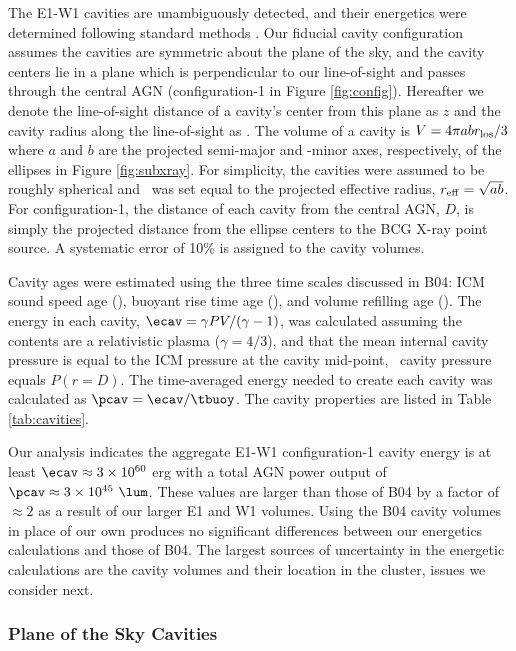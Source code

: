 \documentclass[11pt, preprint]{aastex}
\begin{document}
The E1-W1 cavities are unambiguously detected, and their energetics
were determined following standard methods \citep[see][for a
  review]{mcnamrev}. Our fiducial cavity configuration assumes the
cavities are symmetric about the plane of the sky, and the cavity
centers lie in a plane which is perpendicular to our line-of-sight and
passes through the central AGN (configuration-1 in Figure
\ref{fig:config}). Hereafter we denote the line-of-sight distance of a
cavity's center from this plane as $z$ and the cavity radius along the
line-of-sight as \rlos. The volume of a cavity is $V = 4\pi a b
r_{\rm{los}}/3$ where $a$ and $b$ are the projected semi-major and -minor
axes, respectively, of the ellipses in Figure \ref{fig:subxray}. For
simplicity, the cavities were assumed to be roughly spherical and
\rlos\ was set equal to the projected effective radius, $r_{\rm{eff}} =
\sqrt{ab}$. For configuration-1, the distance of each cavity from the
central AGN, $D$, is simply the projected distance from the ellipse
centers to the BCG X-ray point source. A systematic error of 10\% is
assigned to the cavity volumes.

Cavity ages were estimated using the three time scales discussed in
B04: ICM sound speed age (\tsonic), buoyant rise time age (\tbuoy),
and volume refilling age (\trefill). The energy in each cavity, $\ecav
= \gamma PV/(\gamma-1)$, was calculated assuming the contents are a
relativistic plasma ($\gamma = 4/3$), and that the mean internal
cavity pressure is equal to the ICM pressure at the cavity mid-point,
\ie\ cavity pressure equals $P(r = D)$. The time-averaged energy
needed to create each cavity was calculated as $\pcav =
\ecav/\tbuoy$. The cavity properties are listed in Table
\ref{tab:cavities}.

Our analysis indicates the aggregate E1-W1 configuration-1 cavity
energy is at least $\ecav \approx 3 \times 10^{60}$ erg with a total
AGN power output of $\pcav \approx 3 \times 10^{45} ~\lum$. These
values are larger than those of B04 by a factor of $\approx 2$ as a
result of our larger E1 and W1 volumes. Using the B04 cavity volumes
in place of our own produces no significant differences between our
energetics calculations and those of B04. The largest sources of
uncertainty in the energetic calculations are the cavity volumes and
their location in the cluster, issues we consider next.

\subsubsection{Plane of the Sky Cavities}
\label{sec:dec}
\end{document}
